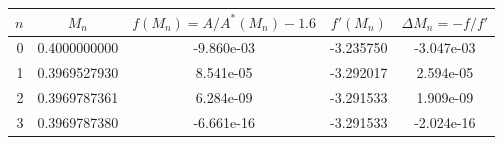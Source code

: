 \begin{tabular}{rcccc}
\toprule
$n$ & $M_n$ & $f(M_n)=A/A^*(M_n)-1.6$ & $f'(M_n)$ & $\Delta M_n=-f/f'$ \\
\midrule
0 & 0.4000000000 & -9.860e-03 & -3.235750 & -3.047e-03 \\
1 & 0.3969527930 & 8.541e-05 & -3.292017 & 2.594e-05 \\
2 & 0.3969787361 & 6.284e-09 & -3.291533 & 1.909e-09 \\
3 & 0.3969787380 & -6.661e-16 & -3.291533 & -2.024e-16 \\
\bottomrule
\end{tabular}